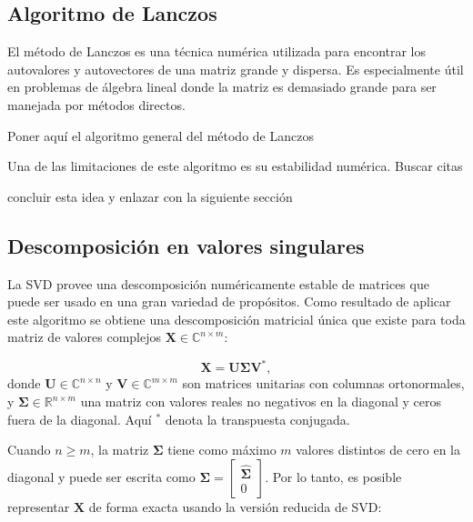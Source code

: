 \subsection*{Algoritmo de Lanczos}\label{subsec:lanczos}

El método de Lanczos es una técnica numérica utilizada para encontrar los autovalores y autovectores de una matriz grande y dispersa. Es especialmente útil en problemas de álgebra lineal donde la matriz es demasiado grande para ser manejada por métodos directos.

\alert{Poner aquí el algoritmo general del método de Lanczos}

Una de las limitaciones de este algoritmo es su estabilidad numérica. \alert{Buscar citas} %

\alert{concluir esta idea y enlazar con la siguiente sección}

\subsection*{Descomposición en valores singulares}\label{subsec:svd}

La SVD provee una descomposición numéricamente estable de matrices que puede ser usado en una gran variedad de propósitos. Como resultado de aplicar este algoritmo se obtiene una descomposición matricial única que existe para toda matriz de valores complejos $\mathbf{X} \in \mathbb{C}^{n \times m}$:

\begin{equation}
	\mathbf{X} = \mathbf{U} \mathbf{\Sigma} \mathbf{V}^*,
\end{equation}
donde $\mathbf{U} \in \mathbb{C}^{n \times n}$ y $\mathbf{V} \in \mathbb{C}^{m \times m}$ son matrices unitarias con columnas ortonormales, y $\mathbf{\Sigma} \in \mathbb{R}^{n \times m}$ una matriz con valores reales no negativos en la diagonal y ceros fuera de la diagonal. Aquí $^*$ denota la transpuesta conjugada.

Cuando $n \ge m$, la matriz $\mathbf{\Sigma}$ tiene como máximo $m$ valores distintos de cero en la diagonal y puede ser escrita como $\mathbf{\Sigma} = \begin{bmatrix}\hat{\mathbf{\Sigma}} \\ 0\end{bmatrix}$. Por lo tanto, es posible representar $\mathbf{X}$ de forma exacta usando la versión reducida de SVD:

